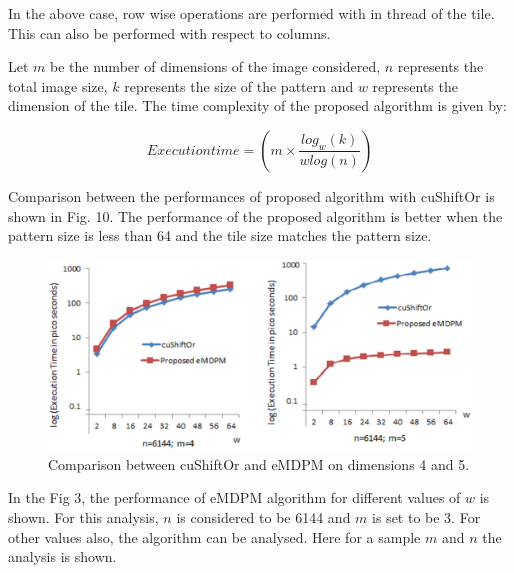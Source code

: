 \documentclass[graybox]{svmult}
\begin{document}
In the above case, row wise operations are performed with in thread of the tile. This can also be performed with respect to columns.

Let $m$ be the number of dimensions of the image considered, $n$ represents the total image size, $k$ represents the size of the pattern and $w$ represents the dimension of the tile. The time complexity of the proposed algorithm is given by:

$$
Execution time = \left( m \times \frac{log_w(k)}{wlog(n)} \right)
$$

Comparison between the performances of proposed algorithm with cuShiftOr is shown in Fig. 10. The performance of the proposed algorithm is better when the pattern size is less than 64 and the tile size matches the pattern size.

\begin{figure}
\sidecaption
\includegraphics[scale=.29]{compare0.eps}
%
%
\caption{Comparison between cuShiftOr and eMDPM on dimensions 4 and 5.}
\label{fig:2}       %
\end{figure}

In the Fig 3, the performance of eMDPM algorithm for different values of $w$ is shown. For this analysis, $n$ is considered to be 6144 and $m$ is set to be 3. For other values also, the algorithm can be analysed. Here for a sample $m$ and $n$ the analysis is shown.
\end{document}
